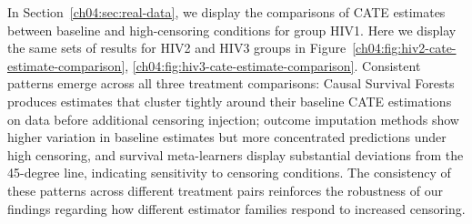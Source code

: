 In Section~\ref{ch04:sec:real-data}, we display the comparisons of CATE estimates between baseline and high-censoring conditions for group HIV1.
Here we display the same sets of results for HIV2 and HIV3 groups in Figure~\ref{ch04:fig:hiv2-cate-estimate-comparison}, \ref{ch04:fig:hiv3-cate-estimate-comparison}.
Consistent patterns emerge across all three treatment comparisons: Causal Survival Forests produces estimates that cluster tightly around their baseline CATE estimations on data before additional censoring injection; outcome imputation methods show higher variation in baseline estimates but more concentrated predictions under high censoring, and survival meta-learners display substantial deviations from the 45-degree line, indicating sensitivity to censoring conditions.
The consistency of these patterns across different treatment pairs reinforces the robustness of our findings regarding how different estimator families respond to increased censoring.














